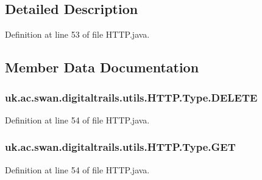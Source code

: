 \subsection{Detailed Description}


Definition at line 53 of file H\+T\+T\+P.\+java.



\subsection{Member Data Documentation}
\hypertarget{enumuk_1_1ac_1_1swan_1_1digitaltrails_1_1utils_1_1_h_t_t_p_1_1_type_a399ae3964d81f49f073a0e92e13fafa7}{
\subsubsection[{D\+E\+L\+E\+T\+E}]{\setlength{\rightskip}{0pt plus 5cm}uk.\+ac.\+swan.\+digitaltrails.\+utils.\+H\+T\+T\+P.\+Type.\+D\+E\+L\+E\+T\+E}}\label{enumuk_1_1ac_1_1swan_1_1digitaltrails_1_1utils_1_1_h_t_t_p_1_1_type_a399ae3964d81f49f073a0e92e13fafa7}


Definition at line 54 of file H\+T\+T\+P.\+java.

\hypertarget{enumuk_1_1ac_1_1swan_1_1digitaltrails_1_1utils_1_1_h_t_t_p_1_1_type_ac42012402ddc7101b26f98d4c07f6e3d}{
\subsubsection[{G\+E\+T}]{\setlength{\rightskip}{0pt plus 5cm}uk.\+ac.\+swan.\+digitaltrails.\+utils.\+H\+T\+T\+P.\+Type.\+G\+E\+T}}\label{enumuk_1_1ac_1_1swan_1_1digitaltrails_1_1utils_1_1_h_t_t_p_1_1_type_ac42012402ddc7101b26f98d4c07f6e3d}


Definition at line 54 of file H\+T\+T\+P.\+java.

